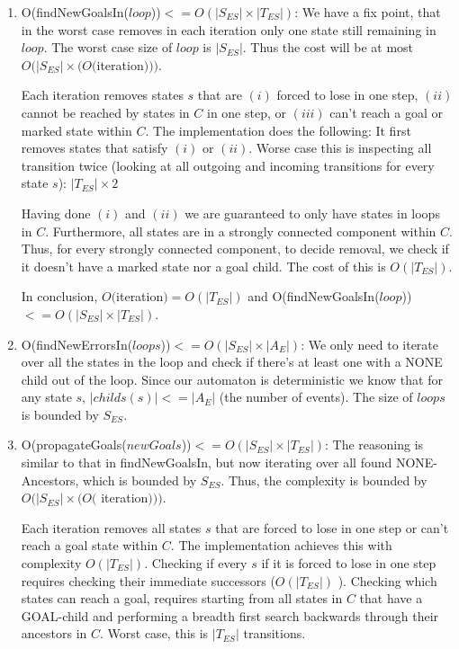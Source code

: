 \begin{enumerate}
	\item O(findNewGoalsIn($loop$))$ <= O(|S_{ES}| \times |T_{ES}|)$: We have a fix point, 
	that in the worst case removes in each iteration only one state still remaining in 
	$loop$. The worst case size of $loop$ is $|S_{ES}|$.  Thus the cost will be  at most 
	$O(|S_{ES}| \times (O($iteration$)))$. 
	
	Each iteration removes states $s$ that are $(i)$
	forced 
	to lose in one step, $(ii)$ cannot be reached by states in $C$ in one step, or $(iii)$ can't 
	reach a goal or marked state 
	within 	$C$. The implementation  does the following: It first removes states that satisfy 
	$(i)$ 
	or $(ii)$. Worse case this is inspecting all transition  twice (looking at all outgoing 
	and incoming transitions for every state $s$): $|T_{ES}| \times 2$
	
	Having done $(i)$ and $(ii)$ we are 
	guaranteed to  only have states in loops in $C$. Furthermore, all states are in a strongly 
	connected component within $C$. Thus, for every strongly connected component, to decide 
	removal, we check 
	if it doesn't have a 
	marked 
	state nor a goal child. The cost of this is  $O(|T_{ES}|)$.
	
	In conclusion, 	$O($iteration$) = O(|T_{ES}|)$ and O(findNewGoalsIn($loop$))$ <= 
	O(|S_{ES}| \times |T_{ES}|)$.
	
	
	
	\item O(findNewErrorsIn($loops$))$ <= O(|S_{ES}| \times |A_E|)$: We only need to 
	iterate over all the states in the loop and check if there's at least one with a NONE 
	child 
	out of the loop. Since our automaton is deterministic we know that for any state 
	$s$, 
	$|childs(s)|<=|A_E|$ (the number of events).  The size of $loops$ is bounded by $S_{ES}$.
	
	
	
	\item O(propagateGoals($newGoals$))$ <= O(|S_{ES}| \times |T_{ES}|)$: 
	The reasoning is similar to that in findNewGoalsIn, but now iterating over all found 
	NONE-Ancestors, which is bounded by $S_{ES}$.  Thus, the complexity is bounded by 
	$O(|S_{ES}| \times (O($ 
	iteration$)))$. 
	
	Each iteration removes all states 
	$s$ that are forced to lose in one step or can't reach a goal state within $C$. The 
	implementation 
	achieves this with complexity $O(|T_{ES}|)$. Checking if every $s$ if it is forced to lose in 
	one 
	step  requires checking their immediate  successors ($O(|T_{ES}|)$ ). Checking which 
	states can reach a goal, 
	requires starting from all states in $C$ that have a GOAL-child and performing a  breadth 
	first search backwards through their ancestors in $C$. Worst case, this is  $|T_{ES}|$ 
	transitions.
	

\end{enumerate}
